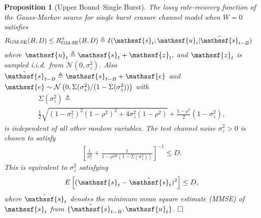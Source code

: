 \documentclass[journal, twocolumn, 10pt]{IEEEtran}
\newtheorem{prop}{Proposition}
\newcommand{\defeq}{\stackrel{\Delta}{=}}
\renewcommand{\defeq}{\triangleq}
\newcommand{\rve}{{\mathssf{e}}}    %
\newcommand{\rvs}{{\mathssf{s}}}    %
\newcommand{\rvu}{{\mathssf{u}}}    %
\newcommand{\rvz}{{\mathssf{z}}}    %
\begin{document}
\begin{prop}[Upper Bound--Single Burst]
\label{prop:GMAch}
The lossy rate-recovery function of the Gauss-Markov source for single burst erasure channel model when $W=0$ satisfies
\begin{align}
R_{\textrm{GM-SE}}(B,D) \le R^{+}_{\textrm{GM-SE}}(B,D) &\triangleq  I(\rvs_{t};\rvu_{t} | \tilde{\rvs}_{t-B})\label{eq:GM-LB-R}
\end{align} where $\rvu_{t} \triangleq \rvs_{t} + \rvz_{t},$ and $\rvz_{t}$ is sampled i.i.d.\ from $\mathcal{N}(0, \sigma^2_{z})$. Also $\tilde{\rvs}_{t-B} \defeq {\rvs}_{t-B} +\rve$ and  $\rve\sim \mathcal{N}\left(0, \Sigma(\sigma^{2}_{z})/(1-\Sigma(\sigma^{2}_{z}))\right)$ with 
 \begin{multline}
\Sigma(\sigma^{2}_{z}) \triangleq \\ \frac{1}{2}\sqrt{(1-\sigma^2_{z})^2(1-\rho^2)^2+4\sigma^2_{z}(1-\rho^2) } + \frac{1-\rho^2}{2}(1-\sigma^2_{z}) \label{eq:Sigma1},
\end{multline} is independent of all other random variables. The test channel noise $\sigma^2_{z}>0$ is chosen to satisfy
\begin{align}
\left[\frac{1}{\sigma^2_{z}} + \frac{1}{1-\rho^{2B}(1-\Sigma(\sigma^2_z))}\right]^{-1} \le D.
\end{align} This is equivalent to $\sigma^2_{z}$ satisfying
\begin{align}
 E\left[(\rvs_{t}-\hat{\rvs}_t)^2\right] \le D, \label{eq:GM-LB-RR}
\end{align} where $\hat{\rvs}_{t}$ denotes the minimum mean square estimate (MMSE) of $\rvs_{t}$ from $\{\tilde{\rvs}_{t-B}, \rvu_{t}\}$.  
$\hfill\Box$
\end{prop}
\end{document}
